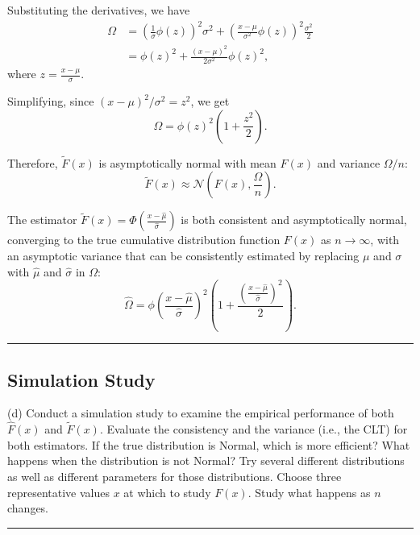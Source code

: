 \documentclass{article}
\newenvironment{colorparagraph}[1]{\par\color{#1}}{\par}
\begin{document}
Substituting the derivatives, we have
\[
\begin{aligned}
\Omega &= \left( \frac{1}{\sigma} \phi(z) \right)^2 \sigma^2 + \left( \frac{x - \mu}{\sigma^2} \phi(z) \right)^2 \frac{\sigma^2}{2} \\
&= \phi(z)^2 + \frac{(x - \mu)^2}{2 \sigma^2} \phi(z)^2,
\end{aligned}
\]
where \( z = \frac{x - \mu}{\sigma} \).

Simplifying, since \( (x - \mu)^2 / \sigma^2 = z^2 \), we get
\[
\Omega = \phi(z)^2 \left( 1 + \frac{z^2}{2} \right).
\]

Therefore, \( \tilde{F}(x) \) is asymptotically normal with mean \( F(x) \) and variance \( \Omega / n \):
\[
\tilde{F}(x) \approx \mathcal{N}\left( F(x), \frac{\Omega}{n} \right).
\]

The estimator \( \tilde{F}(x) = \Phi\left( \frac{x - \hat{\mu}}{\hat{\sigma}} \right) \) is both consistent and asymptotically normal, converging to the true cumulative distribution function \( F(x) \) as \( n \to \infty \), with an asymptotic variance that can be consistently estimated by replacing \( \mu \) and \( \sigma \) with \( \hat{\mu} \) and \( \hat{\sigma} \) in \( \Omega \):
\[
\hat{\Omega} = \phi\left( \frac{x - \hat{\mu}}{\hat{\sigma}} \right)^2 \left( 1 + \frac{\left( \frac{x - \hat{\mu}}{\hat{\sigma}} \right)^2}{2} \right).
\]

\begin{colorparagraph}{questioncolor}
\label{q2d}
\rule{\textwidth}{0.5pt}
\subsection{Simulation Study}
(d) Conduct a simulation study to examine the empirical performance of both \( \hat{F}(x) \) and \( \tilde{F}(x) \).
Evaluate the consistency and the variance (i.e., the CLT) for both estimators. If the true distribution is Normal, which is more efficient? What happens when the distribution is not Normal? Try several different distributions as well as different parameters for those distributions. Choose three representative values \( x \) at which to study \( F(x) \). Study what happens as \( n \) changes.

\rule{\textwidth}{0.5pt}
\end{colorparagraph}

\end{document}
